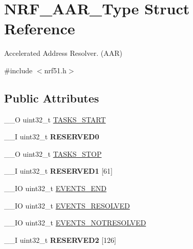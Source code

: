 \hypertarget{struct_n_r_f___a_a_r___type}{}\section{N\+R\+F\+\_\+\+A\+A\+R\+\_\+\+Type Struct Reference}
\label{struct_n_r_f___a_a_r___type}


Accelerated Address Resolver. (A\+A\+R)  




{\ttfamily \#include $<$nrf51.\+h$>$}

\subsection*{Public Attributes}
\begin{DoxyCompactItemize}
\item 
\+\_\+\+\_\+\+O uint32\+\_\+t \hyperlink{struct_n_r_f___a_a_r___type_a0433e01e4de6898a1dc47228b4d432e6}{T\+A\+S\+K\+S\+\_\+\+S\+T\+A\+R\+T}
\item 
\hypertarget{struct_n_r_f___a_a_r___type_a3c29d176ecba1c3968ba1660ee852be0}{}\+\_\+\+\_\+\+I uint32\+\_\+t {\bfseries R\+E\+S\+E\+R\+V\+E\+D0}\label{struct_n_r_f___a_a_r___type_a3c29d176ecba1c3968ba1660ee852be0}

\item 
\+\_\+\+\_\+\+O uint32\+\_\+t \hyperlink{struct_n_r_f___a_a_r___type_aa11597a0f75ec90e6e4a672363c9672e}{T\+A\+S\+K\+S\+\_\+\+S\+T\+O\+P}
\item 
\hypertarget{struct_n_r_f___a_a_r___type_af3f1e7a61d26135463bff6907d990bfb}{}\+\_\+\+\_\+\+I uint32\+\_\+t {\bfseries R\+E\+S\+E\+R\+V\+E\+D1} \mbox{[}61\mbox{]}\label{struct_n_r_f___a_a_r___type_af3f1e7a61d26135463bff6907d990bfb}

\item 
\+\_\+\+\_\+\+I\+O uint32\+\_\+t \hyperlink{struct_n_r_f___a_a_r___type_a64b42f0d33be81c7026db3e857f9332f}{E\+V\+E\+N\+T\+S\+\_\+\+E\+N\+D}
\item 
\+\_\+\+\_\+\+I\+O uint32\+\_\+t \hyperlink{struct_n_r_f___a_a_r___type_a43d79cca1a6ba700c4d9a340cb28fede}{E\+V\+E\+N\+T\+S\+\_\+\+R\+E\+S\+O\+L\+V\+E\+D}
\item 
\+\_\+\+\_\+\+I\+O uint32\+\_\+t \hyperlink{struct_n_r_f___a_a_r___type_ae9d351d9db972def6a6ce656e6f16408}{E\+V\+E\+N\+T\+S\+\_\+\+N\+O\+T\+R\+E\+S\+O\+L\+V\+E\+D}
\item 
\hypertarget{struct_n_r_f___a_a_r___type_ad86b8085a3c035e3b95b2aafd2966a64}{}\+\_\+\+\_\+\+I uint32\+\_\+t {\bfseries R\+E\+S\+E\+R\+V\+E\+D2} \mbox{[}126\mbox{]}\label{struct_n_r_f___a_a_r___type_ad86b8085a3c035e3b95b2aafd2966a64}


\end{DoxyCompactItemize}
